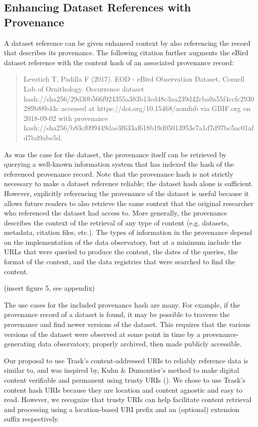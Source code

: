 \documentclass[12pt,letterpaper]{article}
\begin{document}
\subsection*{Enhancing Dataset References with Provenance}

A dataset reference can be given enhanced context by also referencing the record that describes its provenance. The following citation further augments the eBird dataset reference with the content hash of an associated provenance record:

\begin{quote}
    Levatich T, Padilla F (2017). EOD - eBird Observation Dataset. Cornell Lab of Ornithology. Occurrence dataset hash://sha256/29d30b566f924355a383b13cd48c3aa239d42cba0a55f4ccfc2930289b88b43c accessed at https://doi.org/10.15468/aomfnb via GBIF.org on 2018-09-02 with provenance hash://sha256/b83cf099449dae3f633af618b19d05013953e7a1d7d97bc5ac01afd7bd9abe5d.
\end{quote}

As was the case for the dataset, the provenance itself can be retrieved by querying a well-known information system that has indexed the hash of the referenced provenance record. Note that the provenance hash is not strictly necessary to make a dataset reference reliable; the dataset hash alone is sufficient. However, explicitly referencing the provenance of the dataset is useful because it allows future readers to also retrieve the same context that the original researcher who referenced the dataset had access to. More generally, the provenance describes the context of the retrieval of any type of content (e.g. datasets, metadata, citation files, etc.). The types of information in the provenance depend on the implementation of the data observatory, but at a minimum include the URLs that were queried to produce the content, the dates of the queries, the format of the content, and the data registries that were searched to find the content.

% 
(insert figure 5, see appendix)

 The use cases for the included provenance hash are many. For example, if the provenance record of a dataset is found, it may be possible to traverse the provenance and find newer versions of the dataset. This requires that the various versions of the dataset were observed at some point in time by a provenance-generating data observatory, properly archived, then made publicly accessible.

 Our proposal to use Trask's content-addressed URIs to reliably reference data is similar to, and was inspired by, Kuhn \& Dumontier's method to make digital content verifiable and permanent using trusty URIs (\cite{Kuhn_2015}). We chose to use Trask's content hash URIs because they are location and content agnostic and easy to read. However, we recognize that trusty URIs can help facilitate content retrieval and processing using a location-based URI prefix and an (optional) extension suffix respectively. 
\end{document}

